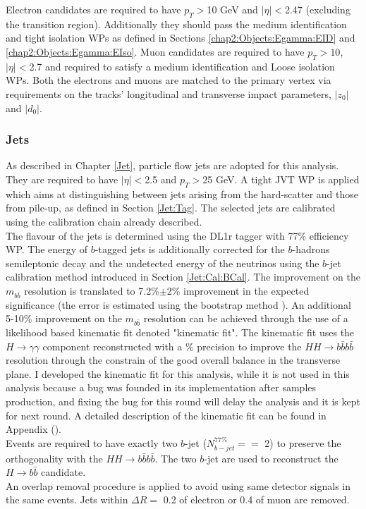 Electron candidates are required to have $p_T > $10 GeV and $|\eta| < $2.47 (excluding the transition region). Additionally they should pass the medium identification and tight isolation WPs as defined in Sections \ref{chap2:Objects:Egamma:EID} and \ref{chap2:Objects:Egamma:EIso}. Muon candidates are required to have $p_T > 10$, $|\eta| < $2.7 and required to satisfy a medium identification and Loose isolation WPs. Both the electrons and muons are matched to the primary vertex via requirements on the tracks' longitudinal and transverse impact parameters, $|z_0|$ and $|d_0|$.

\subsubsection{Jets}
\label{HHyybb:ObjEvt:Obj:Jet}
As described in Chapter \ref{Jet}, particle flow jets are adopted for this analysis. They are required to have $|\eta| < $2.5 and $p_T > $25 GeV. A tight JVT WP is applied which aims at distinguishing between jets arising from the hard-scatter and those from pile-up, as defined in Section \ref{Jet:Tag}. The selected jets are calibrated using the calibration chain already described. \\

The flavour of the jets is determined using the DL1r tagger with 77\% efficiency WP. The energy of $b$-tagged jets is additionally corrected for the $b$-hadrons semileptonic decay and the undetected energy of the neutrinos using the $b$-jet calibration method introduced in Section \ref{Jet:Cal:BCal}. The improvement on the $m_{b\bar{b}}$ resolution is translated to 7.2\%$\pm$2\% improvement in the expected significance (the error is estimated using the bootstrap method \cite{Bootstrap}). An additional 5-10\% improvement on the $m_{b\bar{b}}$ resolution can be achieved through the use of a likelihood based kinematic fit denoted "kinematic fit". The kinematic fit uses the $H\to\gamma\gamma$ component reconstructed with a \% precision  to improve the $HH\to b\bar{b}b\bar{b}$ resolution through the constrain of the good overall balance in the transverse plane. I developed the kinematic fit for this \HHyybb analysis, while it is not used in this analysis because a bug was founded in its implementation after samples production, and fixing the bug for this round will delay the analysis and it is kept for next round. A detailed description of the kinematic fit can be found in Appendix (). \\

Events are required to have exactly two $b$-jet ($N_{b-jet}^{77\%} ==$ 2) to preserve the orthogonality with the $HH\to b\bar{b}b\bar{b}$. The two $b$-jet are used to reconstruct the $H\to b\bar{b}$ candidate. \\
An overlap removal procedure is applied to avoid using same detector signals in the same events. Jets within $\Delta R=$ 0.2 of electron or 0.4 of muon are removed.

